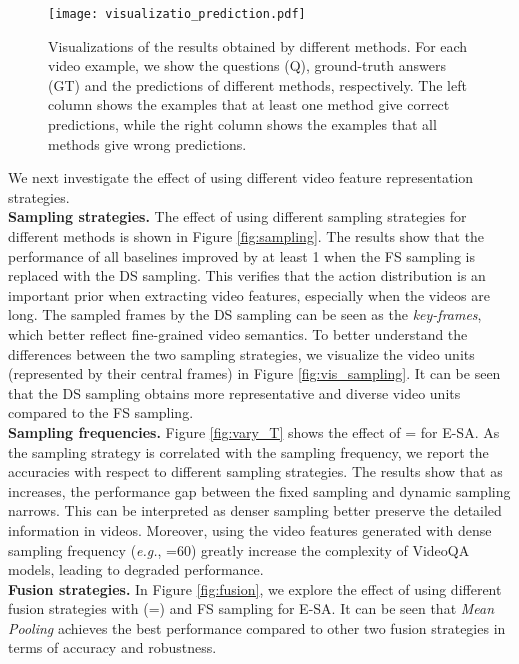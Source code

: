 \documentclass[letterpaper]{article} \usepackage{aaai19}  \usepackage{times}  \usepackage{helvet}  \usepackage{courier}  \usepackage{url}  \usepackage{graphicx}  \usepackage{amsfonts}
\begin{document}
\begin{figure*}
\centering
\texttt{[image: visualizatio\_prediction.pdf]}
\caption{Visualizations of the results obtained by different methods. For each video example, we show the questions (Q), ground-truth answers (GT) and the predictions of different methods, respectively. The left column shows the examples that at least one method give correct predictions, while the right column shows the examples that all methods give wrong predictions.}
\label{fig:vis_results}
\end{figure*}
We next investigate the effect of using different video feature representation strategies.
\\
\textbf{Sampling strategies.} The effect of using different sampling strategies for different methods is shown in Figure \ref{fig:sampling}. The results show that the performance of all baselines improved by at least 1 when the FS sampling is replaced with the DS sampling. This verifies that the action distribution is an important prior when extracting video features, especially when the videos are long. The sampled frames by the DS sampling can be seen as the \emph{key-frames}, which better reflect fine-grained video semantics. To better understand the differences between the two sampling strategies, we visualize the video units (represented by their central frames) in Figure \ref{fig:vis_sampling}. It can be seen that the DS sampling obtains more representative and diverse video units compared to the FS sampling.
\\
\textbf{Sampling frequencies.} Figure \ref{fig:vary_T} shows the effect of = for E-SA. As the sampling strategy is correlated with the sampling frequency, we report the accuracies with respect to different sampling strategies. The results show that as  increases, the performance gap between the fixed sampling and dynamic sampling narrows. This can be interpreted as denser sampling better preserve the detailed information in videos. Moreover, using the video features generated with dense sampling frequency (\emph{e.g.}, =60) greatly increase the complexity of VideoQA models, leading to degraded performance.
\\
\textbf{Fusion strategies.} In Figure \ref{fig:fusion}, we explore the effect of using different fusion strategies with (=) and FS sampling for E-SA. It can be seen that \emph{Mean Pooling} achieves the best performance compared to other two fusion strategies in terms of accuracy and robustness.
\end{document}
